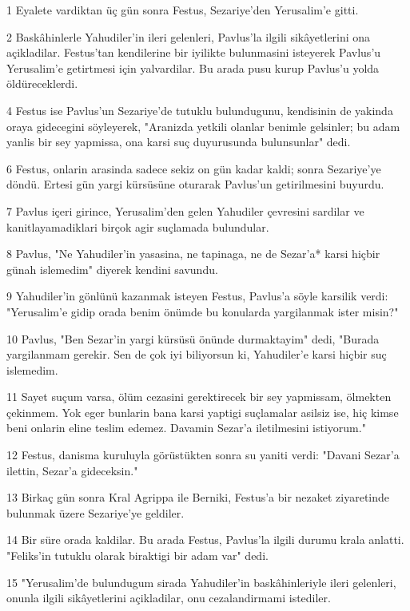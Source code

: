 \par 1 Eyalete vardiktan üç gün sonra Festus, Sezariye'den Yerusalim'e gitti.
\par 2 Baskâhinlerle Yahudiler'in ileri gelenleri, Pavlus'la ilgili sikâyetlerini ona açikladilar. Festus'tan kendilerine bir iyilikte bulunmasini isteyerek Pavlus'u Yerusalim'e getirtmesi için yalvardilar. Bu arada pusu kurup Pavlus'u yolda öldüreceklerdi.
\par 4 Festus ise Pavlus'un Sezariye'de tutuklu bulundugunu, kendisinin de yakinda oraya gidecegini söyleyerek, "Aranizda yetkili olanlar benimle gelsinler; bu adam yanlis bir sey yapmissa, ona karsi suç duyurusunda bulunsunlar" dedi.
\par 6 Festus, onlarin arasinda sadece sekiz on gün kadar kaldi; sonra Sezariye'ye döndü. Ertesi gün yargi kürsüsüne oturarak Pavlus'un getirilmesini buyurdu.
\par 7 Pavlus içeri girince, Yerusalim'den gelen Yahudiler çevresini sardilar ve kanitlayamadiklari birçok agir suçlamada bulundular.
\par 8 Pavlus, "Ne Yahudiler'in yasasina, ne tapinaga, ne de Sezar'a* karsi hiçbir günah islemedim" diyerek kendini savundu.
\par 9 Yahudiler'in gönlünü kazanmak isteyen Festus, Pavlus'a söyle karsilik verdi: "Yerusalim'e gidip orada benim önümde bu konularda yargilanmak ister misin?"
\par 10 Pavlus, "Ben Sezar'in yargi kürsüsü önünde durmaktayim" dedi, "Burada yargilanmam gerekir. Sen de çok iyi biliyorsun ki, Yahudiler'e karsi hiçbir suç islemedim.
\par 11 Sayet suçum varsa, ölüm cezasini gerektirecek bir sey yapmissam, ölmekten çekinmem. Yok eger bunlarin bana karsi yaptigi suçlamalar asilsiz ise, hiç kimse beni onlarin eline teslim edemez. Davamin Sezar'a iletilmesini istiyorum."
\par 12 Festus, danisma kuruluyla görüstükten sonra su yaniti verdi: "Davani Sezar'a ilettin, Sezar'a gideceksin."
\par 13 Birkaç gün sonra Kral Agrippa ile Berniki, Festus'a bir nezaket ziyaretinde bulunmak üzere Sezariye'ye geldiler.
\par 14 Bir süre orada kaldilar. Bu arada Festus, Pavlus'la ilgili durumu krala anlatti. "Feliks'in tutuklu olarak biraktigi bir adam var" dedi.
\par 15 "Yerusalim'de bulundugum sirada Yahudiler'in baskâhinleriyle ileri gelenleri, onunla ilgili sikâyetlerini açikladilar, onu cezalandirmami istediler.

